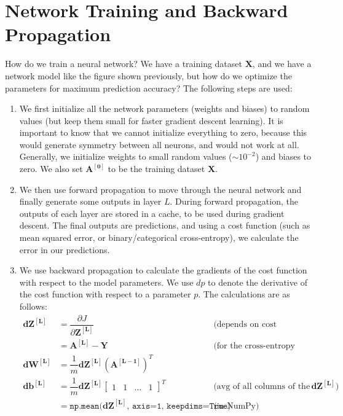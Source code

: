 \documentclass[a4paper, 12pt]{report}
\begin{document}
\section{Network Training and Backward Propagation}
How do we train a neural network? We have a training dataset $\bm{X}$, and we have a network model like the figure shown previously, but how do we optimize the parameters for maximum prediction accuracy? The following steps are used:
\begin{enumerate}
\item We first initialize all the network parameters (weights and biases) to random values (but keep them small for faster gradient descent learning). It is important to know that we cannot initialize everything to zero, because this would generate symmetry between all neurons, and would not work at all. Generally, we initialize weights to small random values ($\sim 10^{-2}$) and biases to zero. We also set $\bm{A^{\left[0\right]}}$ to be the training dataset $\bm{X}$.
\item We then use forward propagation to move through the neural network and finally generate some outputs in layer $L$. During forward propagation, the outputs of each layer are stored in a cache, to be used during gradient descent. The final outputs are predictions, and using a cost function (such as mean squared error, or binary/categorical cross-entropy), we calculate the error in our predictions.
\item We use backward propagation to calculate the gradients of the cost function with respect to the model parameters. We use $dp$ to denote the derivative of the cost function with respect to a parameter $p$. The calculations are as follows: \\
\begin{align*}
\bm{dZ^{\left[L\right]}} &= \dfrac{\partial J}{\partial \bm{Z^{\left[L\right]}}} & \text{(depends on cost function)} \\
&= \bm{A^{\left[L\right]}} - \bm{Y} & \text{(for the cross-entropy cost function)} \\
\bm{dW^{\left[L\right]}} &= \dfrac{1}{m}\bm{dZ^{\left[L\right]}}\left(\bm{A^{\left[L-1\right]}}\right)^T &\\
\bm{db^{\left[L\right]}} &= \dfrac{1}{m}\bm{dZ^{\left[L\right]}}
\begin{bmatrix}
1 & 1 & \dots & 1
\end{bmatrix}^T
& \text{(avg of all columns of the matrix $\bm{dZ^{\left[L\right]}}$)} \\
&= \texttt{np.mean(}\bm{dZ^{\left[L\right]}}\texttt{, axis=1, keepdims=True)} & \text{(in NumPy)} \\

\end{align*}
\end{enumerate}
\end{document}
